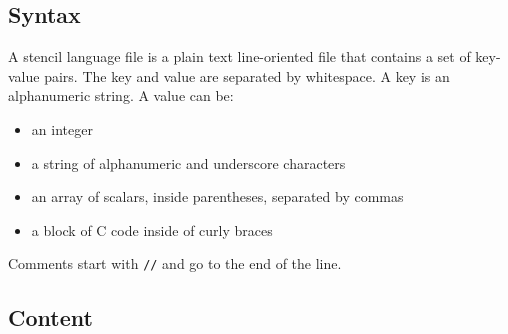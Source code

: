 \documentclass[11pt]{article}
\begin{document}
\subsection{Syntax}

A stencil language file is a plain text line-oriented file that
contains a set of key-value pairs.  The key and value are separated by
whitespace.  A key is an alphanumeric string.  A value can be:
\begin{itemize}
\item an integer
\item a string of alphanumeric and underscore characters
\item an array of scalars, inside parentheses, separated by commas
\item a block of C code inside of curly braces
\end{itemize}
Comments start with {\tt //} and go to the end of the line.

\subsection{Content}
\end{document}
